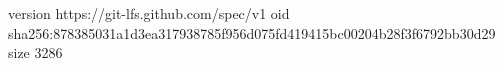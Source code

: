 version https://git-lfs.github.com/spec/v1
oid sha256:878385031a1d3ea317938785f956d075fd419415bc00204b28f3f6792bb30d29
size 3286
